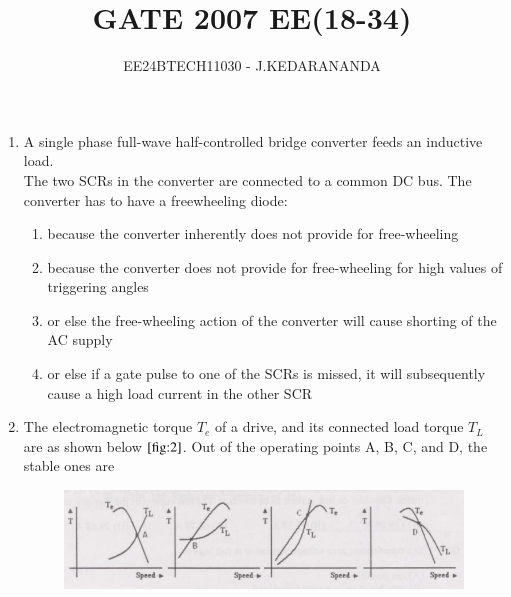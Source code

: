 \documentclass[journal]{IEEEtran}
\renewcommand{\thefigure}{\theenumi}
\renewcommand{\thetable}{\theenumi}
\numberwithin{equation}{enumi}
\numberwithin{figure}{enumi}
\renewcommand{\thetable}{\theenumi}
\begin{document}

\vspace{3cm}

\title{GATE 2007 EE(18-34)}
\author{EE24BTECH11030 - J.KEDARANANDA}
{\let\newpage\relax\maketitle}
\renewcommand{\thefigure}{\theenumi}
\renewcommand{\thetable}{\theenumi}
\begin{enumerate}
    \item A single phase full-wave half-controlled bridge converter feeds an inductive load. \\The two SCRs in the converter are connected to a common DC bus. The converter has to have a freewheeling diode:
    \begin{enumerate}
        \item  because the converter inherently does not provide for free-wheeling
        \item  because the converter does not provide for free-wheeling for high values of triggering angles
        \item  or else the free-wheeling action of the converter will cause shorting of the AC supply
        \item  or else if a gate pulse to one of the SCRs is missed, it will subsequently cause a high load current in the other SCR
    \end{enumerate}
    \bigskip
    \item The electromagnetic torque $T_e$ of a drive, and its connected load torque $T_L$ are as shown below $\ref{fig:2}$. Out of the operating points A, B, C, and D, the stable ones are
    \begin{figure}[!ht]
    \centering
    \includegraphics[width=\linewidth]{figs/2.png}
    \caption{}
    \label{fig:2}
    \end{figure}
\begin{multicols}{4}
\begin{enumerate}

\end{enumerate}
\end{multicols}
\end{enumerate}
\end{document}
